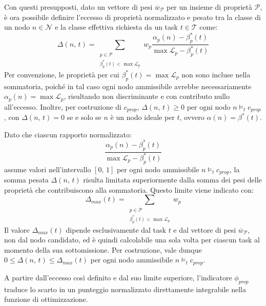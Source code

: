 Con questi presupposti, dato un vettore di pesi $\overline{w}_{\mathcal{P}}$ per un insieme di proprietà $\mathcal{P}$, è ora possibile definire l'eccesso di proprietà normalizzato e pesato tra la classe di un nodo $n \in \mathcal{N}$ e la classe effettiva richiesta da un task $t \in \mathcal{T}$ come:
\begin{equation}
    \label{eq:eccesso_norm}
    \Delta(n,\, t) = \sum_{\substack{p \in \mathcal{P} \\ \beta^*_p(t) < \max \mathcal{L}_p}} 
    w_p \frac{\alpha_p(n) - \beta^*_p(t)}{\max \mathcal{L}_p - \beta^*_p(t)}
\end{equation}
Per convenzione, le proprietà per cui $\beta^*_p(t) = \max \mathcal{L}_p$ non sono incluse nella sommatoria, poiché in tal caso ogni nodo ammissibile avrebbe necessariamente $\alpha_p(n) = \max \mathcal{L}_p$, risultando non discriminante e con contributo nullo all'eccesso. Inoltre, per costruzione di $c_{prop}$, $\Delta(n,\, t) \geq 0$ per ogni nodo $n \models_t c_{prop}$, con $\Delta(n,\, t) = 0$ se e solo se $n$ è un nodo ideale per $t$, ovvero $\alpha(n) = \beta^*(t)$.

Dato che ciascun rapporto normalizzato:
\begin{equation}
    \frac{\alpha_p(n) - \beta^*_p(t)}{\max \mathcal{L}_p - \beta^*_p(t)}
\end{equation}
assume valori nell'intervallo $[0,\,1]$ per ogni nodo ammissibile $n \models_t c_{prop}$, la somma pesata $\Delta(n,\, t)$ risulta limitata superiormente dalla somma dei pesi delle proprietà che contribuiscono alla sommatoria. Questo limite viene indicato con:
\begin{equation}
    \Delta_{max}(t) = \sum_{\substack{p \in \mathcal{P} \\ \beta^*_p(t) < \max \mathcal{L}_p}} w_p
\end{equation}
Il valore $\Delta_{max}(t)$ dipende esclusivamente dal task $t$ e dal vettore di pesi $\overline{w}_{\mathcal{P}}$, non dal nodo candidato, ed è quindi calcolabile una sola volta per ciascun task al momento della sua sottomissione. Per costruzione, vale dunque $0 \leq \Delta(n,\,t) \leq \Delta_{max}(t)$ per ogni nodo ammissibile $n \models_t c_{prop}$.

A partire dall'eccesso così definito e dal suo limite superiore, l'indicatore $\phi_{prop}$ traduce lo scarto in un punteggio normalizzato direttamente integrabile nella funzione di ottimizzazione.

